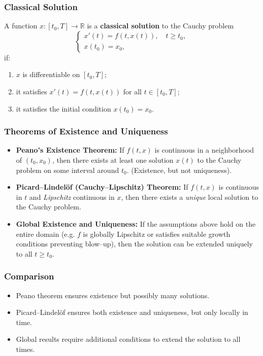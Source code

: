 \documentclass[12pt,a4paper]{book}
\theoremstyle{remark}
\newcommand{\RR}{\mathbb{R}}
\begin{document}
\subsubsection*{Classical Solution}
A function $x:[t_0,T]\to\RR$ is a \textbf{classical solution} to the Cauchy problem
\[
\begin{cases}
x'(t) = f(t,x(t)), \quad t \geq t_0, \\
x(t_0) = x_0,
\end{cases}
\]
if:
\begin{enumerate}[label=\roman*)]
    \item $x$ is differentiable on $[t_0,T]$;
    \item it satisfies $x'(t) = f(t,x(t))$ for all $t \in [t_0,T]$;
    \item it satisfies the initial condition $x(t_0) = x_0$.
\end{enumerate}

\subsubsection*{Theorems of Existence and Uniqueness}
\begin{itemize}
    \item \textbf{Peano’s Existence Theorem:} If $f(t,x)$ is continuous in a neighborhood of $(t_0,x_0)$, then there exists at least one solution $x(t)$ to the Cauchy problem on some interval around $t_0$. (Existence, but not uniqueness).
    
    \item \textbf{Picard–Lindelöf (Cauchy–Lipschitz) Theorem:} If $f(t,x)$ is continuous in $t$ and \emph{Lipschitz} continuous in $x$, then there exists a \emph{unique} local solution to the Cauchy problem. 
    
    \item \textbf{Global Existence and Uniqueness:} If the assumptions above hold on the entire domain (e.g. $f$ is globally Lipschitz or satisfies suitable growth conditions preventing blow–up), then the solution can be extended uniquely to all $t \geq t_0$.
\end{itemize}

\subsubsection*{Comparison}
\begin{itemize}
    \item Peano theorem ensures existence but possibly many solutions.
    \item Picard–Lindelöf ensures both existence and uniqueness, but only locally in time.
    \item Global results require additional conditions to extend the solution to all times.
\end{itemize}
\end{document}
